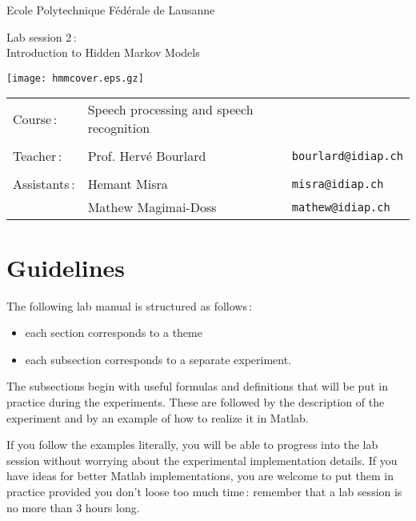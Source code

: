 \documentclass[twoside,a4paper,titlepage]{article}
\begin{document}
\begin{titlepage}
\setcounter{page}{-1}

\centerline{Ecole Polytechnique F\'ed\'erale de Lausanne}

\vspace{5cm}

\begin{center}
\huge
Lab session 2\,: \\
Introduction to Hidden Markov Models
\end{center}

\vfill

\centerline{\texttt{[image: hmmcover.eps.gz]}}

\vfill

\noindent
\begin{tabular}{lll}
Course\,: & Speech processing and speech recognition & \\
& & \\
Teacher\,: & Prof. Herv\'e Bourlard \hspace{1cm} & {\tt bourlard@idiap.ch} \\
& & \\
Assistants\,: & Hemant Misra & {\tt misra@idiap.ch}\\
 & Mathew Magimai-Doss & {\tt mathew@idiap.ch} 
\end{tabular}

\end{titlepage}

\thispagestyle{empty}
\section*{Guidelines}
The following lab manual is structured as follows\,:
\begin{itemize}
\item each section corresponds to a theme
\item each subsection corresponds to a separate experiment.
\end{itemize}
The subsections begin with useful formulas and definitions that will be put
in practice during the experiments. These are followed by the description
of the experiment and by an example of how to realize it in {\sc Matlab}.

If you follow the examples literally, you will be able to progress into the
lab session without worrying about the experimental implementation
details. If you have ideas for better {\sc Matlab} implementations, you are
welcome to put them in practice provided you don't loose too much time\,:
remember that a lab session is no more than 3 hours long.
\end{document}
